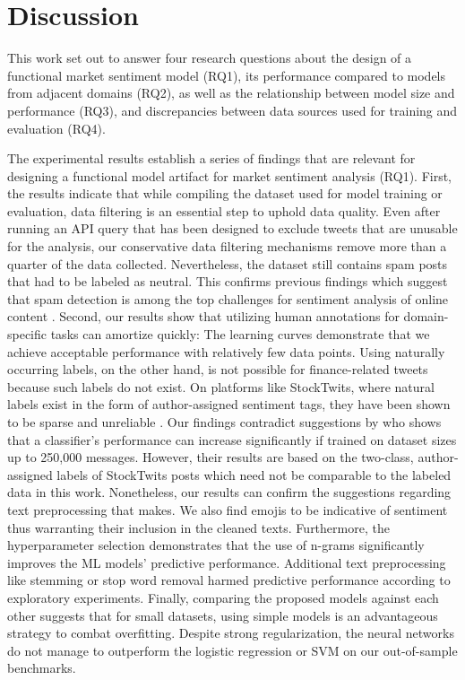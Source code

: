 \section{Discussion}
\label{section-discussion}
This work set out to answer four research questions about the design of a functional market sentiment model (RQ1), its performance compared to models from adjacent domains (RQ2), as well as the relationship between model size and performance (RQ3), and discrepancies between data sources used for training and evaluation (RQ4).

The experimental results establish a series of findings that are relevant for designing a functional model artifact for market sentiment analysis (RQ1). First, the results indicate that while compiling the dataset used for model training or evaluation, data filtering is an essential step to uphold data quality. Even after running an API query that has been designed to exclude tweets that are unusable for the analysis, our conservative data filtering mechanisms remove more than a quarter of the data collected. Nevertheless, the dataset still contains spam posts that had to be labeled as neutral. This confirms previous findings which suggest that spam detection is among the top challenges for sentiment analysis of online content . Second, our results show that utilizing human annotations for domain-specific tasks can amortize quickly: The learning curves demonstrate that we achieve acceptable performance with relatively few data points. Using naturally occurring labels, on the other hand, is not possible for finance-related tweets because such labels do not exist. On platforms like StockTwits, where natural labels exist in the form of author-assigned sentiment tags, they have been shown to be sparse and unreliable . Our findings contradict suggestions by  who shows that a classifier's performance can increase significantly if trained on dataset sizes up to 250,000 messages. However, their results are based on the two-class, author-assigned labels of StockTwits posts which need not be comparable to the labeled data in this work. Nonetheless, our results can confirm the suggestions regarding text preprocessing that  makes. We also find emojis to be indicative of sentiment thus warranting their inclusion in the cleaned texts. Furthermore, the hyperparameter selection demonstrates that the use of n-grams significantly improves the ML models' predictive performance. Additional text preprocessing like stemming or stop word removal harmed predictive performance according to exploratory experiments. Finally, comparing the proposed models against each other suggests that for small datasets, using simple models is an advantageous strategy to combat overfitting. Despite strong regularization, the neural networks do not manage to outperform the logistic regression or SVM on our out-of-sample benchmarks.

